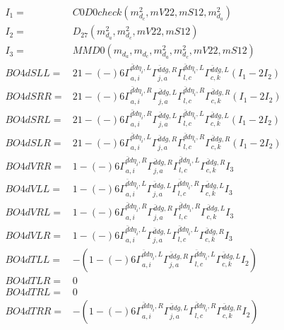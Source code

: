 \documentclass[A4,landscape]{article}
\begin{document}
\begin{align} 
I_1 = & C0D0check(m^2_{d_{{c}}}, mV22, mS12, m^2_{d_{{a}}}) \\ 
I_2 = & D_{27}(m^2_{d_{{a}}}, m^2_{d_{{c}}}, mV22, mS12) \\ 
I_3 = & MMD0(m_{d_{{a}}}, m_{d_{{c}}}, m^2_{d_{{a}}}, m^2_{d_{{c}}}, mV22, mS12) \\ 
  BO4dSLL= & 2   1
-(-)
  6 \Gamma^{\bar{d}d \eta_i ,L}_{a, i} \Gamma^{\bar{d}d g ,R}_{j, a} \Gamma^{\bar{d}d \eta_i ,L}_{l, c} \Gamma^{\bar{d}d g ,L}_{c, k} (I_1 - 2 I_2) \\ 
  BO4dSRR= & 2   1
-(-)
  6 \Gamma^{\bar{d}d \eta_i ,R}_{a, i} \Gamma^{\bar{d}d g ,L}_{j, a} \Gamma^{\bar{d}d \eta_i ,R}_{l, c} \Gamma^{\bar{d}d g ,R}_{c, k} (I_1 - 2 I_2) \\ 
  BO4dSRL= & 2   1
-(-)
  6 \Gamma^{\bar{d}d \eta_i ,R}_{a, i} \Gamma^{\bar{d}d g ,L}_{j, a} \Gamma^{\bar{d}d \eta_i ,L}_{l, c} \Gamma^{\bar{d}d g ,L}_{c, k} (I_1 - 2 I_2) \\ 
  BO4dSLR= & 2   1
-(-)
  6 \Gamma^{\bar{d}d \eta_i ,L}_{a, i} \Gamma^{\bar{d}d g ,R}_{j, a} \Gamma^{\bar{d}d \eta_i ,R}_{l, c} \Gamma^{\bar{d}d g ,R}_{c, k} (I_1 - 2 I_2) \\ 
  BO4dVRR= &   1
-(-)
  6 \Gamma^{\bar{d}d \eta_i ,R}_{a, i} \Gamma^{\bar{d}d g ,R}_{j, a} \Gamma^{\bar{d}d \eta_i ,L}_{l, c} \Gamma^{\bar{d}d g ,R}_{c, k} I_3 \\ 
  BO4dVLL= &   1
-(-)
  6 \Gamma^{\bar{d}d \eta_i ,L}_{a, i} \Gamma^{\bar{d}d g ,L}_{j, a} \Gamma^{\bar{d}d \eta_i ,R}_{l, c} \Gamma^{\bar{d}d g ,L}_{c, k} I_3 \\ 
  BO4dVRL= &   1
-(-)
  6 \Gamma^{\bar{d}d \eta_i ,R}_{a, i} \Gamma^{\bar{d}d g ,R}_{j, a} \Gamma^{\bar{d}d \eta_i ,R}_{l, c} \Gamma^{\bar{d}d g ,L}_{c, k} I_3 \\ 
  BO4dVLR= &   1
-(-)
  6 \Gamma^{\bar{d}d \eta_i ,L}_{a, i} \Gamma^{\bar{d}d g ,L}_{j, a} \Gamma^{\bar{d}d \eta_i ,L}_{l, c} \Gamma^{\bar{d}d g ,R}_{c, k} I_3 \\ 
  BO4dTLL= & -(  1
-(-)
  6 \Gamma^{\bar{d}d \eta_i ,L}_{a, i} \Gamma^{\bar{d}d g ,R}_{j, a} \Gamma^{\bar{d}d \eta_i ,L}_{l, c} \Gamma^{\bar{d}d g ,L}_{c, k} I_2) \\ 
  BO4dTLR= & 0 \\ 
  BO4dTRL= & 0 \\ 
  BO4dTRR= & -(  1
-(-)
  6 \Gamma^{\bar{d}d \eta_i ,R}_{a, i} \Gamma^{\bar{d}d g ,L}_{j, a} \Gamma^{\bar{d}d \eta_i ,R}_{l, c} \Gamma^{\bar{d}d g ,R}_{c, k} I_2) \\ 
\end{align} 
\end{document}
